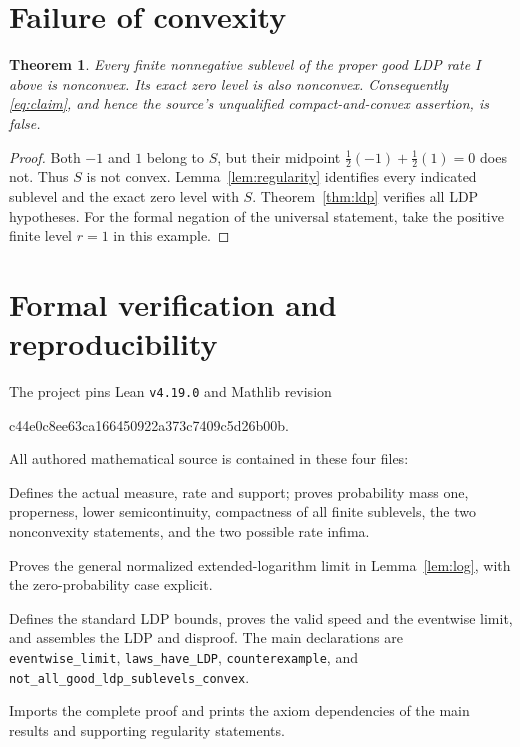 \documentclass[11pt]{article}
\newtheorem{theorem}{Theorem}
\begin{document}
\section{Failure of convexity}

\begin{theorem}\label{thm:counterexample}
Every finite nonnegative sublevel of the proper good LDP rate $I$ above is
nonconvex. Its exact zero level is also nonconvex. Consequently
\eqref{eq:claim}, and hence the source's unqualified compact-and-convex
assertion, is false.
\end{theorem}
\begin{proof}
Both $-1$ and $1$ belong to $S$, but their midpoint
$\tfrac12(-1)+\tfrac12(1)=0$ does not. Thus $S$ is not convex.
Lemma~\ref{lem:regularity} identifies every indicated sublevel and the exact
zero level with $S$. Theorem~\ref{thm:ldp} verifies all LDP hypotheses.
For the formal negation of the universal statement, take the positive
finite level $r=1$ in this example.
\end{proof}

\section{Formal verification and reproducibility}

The project pins Lean \texttt{v4.19.0} and Mathlib revision
\begin{center}\small\ttfamily
c44e0c8ee63ca166450922a373c7409c5d26b00b.
\end{center}
All authored mathematical source is contained in these four files:
\begin{description}[style=nextline]
\item[\texttt{Conjecture2821/Basic.lean}]
Defines the actual measure, rate and support; proves probability mass one,
properness, lower semicontinuity, compactness of all finite sublevels,
the two nonconvexity statements, and the two possible rate infima.
\item[\texttt{Conjecture2821/Limits.lean}]
Proves the general normalized extended-logarithm limit in
Lemma~\ref{lem:log}, with the zero-probability case explicit.
\item[\texttt{Conjecture2821/LDP.lean}]
Defines the standard LDP bounds, proves the valid speed and the eventwise
limit, and assembles the LDP and disproof. The main declarations are
\texttt{eventwise\_limit}, \texttt{laws\_have\_LDP}, \texttt{counterexample},
and \texttt{not\_all\_good\_ldp\_sublevels\_convex}.
\item[\texttt{Conjecture2821.lean}]
Imports the complete proof and prints the axiom dependencies of the main
results and supporting regularity statements.
\end{description}
\end{document}
